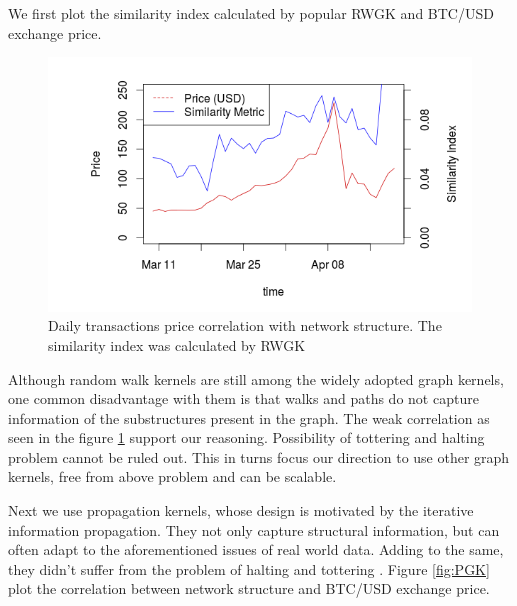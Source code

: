 We first plot the similarity index calculated by popular RWGK and BTC/USD exchange price.

\begin{figure}[ht]
\begin{center}
\includegraphics[width=\textwidth]{./Figures/pnc.png}
\caption{Daily transactions price correlation with network structure. The similarity index was calculated by RWGK }
\label{fig:RWGK}
\end{center}
\end{figure}

Although random walk kernels are still among the widely adopted graph kernels, one common disadvantage with them is that walks and paths do not capture information of the substructures present in the graph. The weak correlation as seen in the figure \ref{fig:RWGK} support our reasoning. Possibility of tottering \citep{Mahe2004} and halting \citep{Sugiyama2015} problem cannot be ruled out. This in turns focus our direction to use other graph kernels, free from above problem and can be scalable.

Next we use propagation kernels, whose design is motivated by the
iterative information propagation. They not only capture structural information, but can often adapt to the aforementioned issues of real world data. Adding to the same, they didn’t  suffer from the problem of halting and tottering \citep{Neumann2015}. Figure \ref{fig:PGK} plot the correlation between network structure and BTC/USD exchange price.

